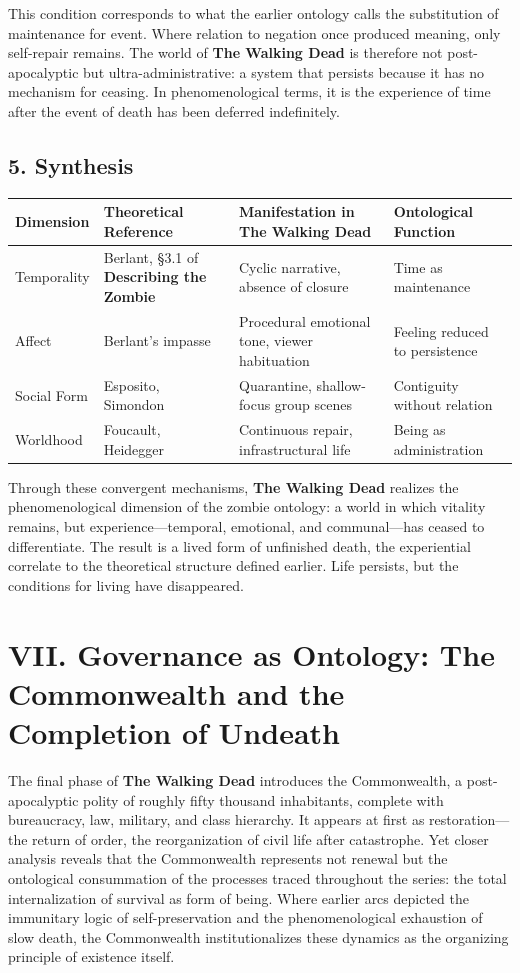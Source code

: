 \documentclass[11pt]{article}
\begin{document}
This condition corresponds to what the earlier ontology calls the substitution of maintenance for event.  Where relation to negation once produced meaning, only self-repair remains.  The world of \textbf{The Walking Dead} is therefore not post-apocalyptic but ultra-administrative: a system that persists because it has no mechanism for ceasing.  In phenomenological terms, it is the experience of time after the event of death has been deferred indefinitely.  
\subsection*{5. Synthesis}
\label{sec:orge80ebef}

\begin{center}
\begin{tabular}{llll}
Dimension & Theoretical Reference & Manifestation in \textbf{The Walking Dead} & Ontological Function\\
\hline
Temporality & Berlant, §3.1 of \textbf{Describing the Zombie} & Cyclic narrative, absence of closure & Time as maintenance\\
Affect & Berlant’s impasse & Procedural emotional tone, viewer habituation & Feeling reduced to persistence\\
Social Form & Esposito, Simondon & Quarantine, shallow-focus group scenes & Contiguity without relation\\
Worldhood & Foucault, Heidegger & Continuous repair, infrastructural life & Being as administration\\
\end{tabular}
\end{center}

Through these convergent mechanisms, \textbf{The Walking Dead} realizes the phenomenological dimension of the zombie ontology: a world in which vitality remains, but experience—temporal, emotional, and communal—has ceased to differentiate.  The result is a lived form of unfinished death, the experiential correlate to the theoretical structure defined earlier.  Life persists, but the conditions for living have disappeared.  
\section*{VII. Governance as Ontology: The Commonwealth and the Completion of Undeath}
\label{sec:org8f68535}

The final phase of \textbf{The Walking Dead} introduces the Commonwealth, a post-apocalyptic polity of roughly fifty thousand inhabitants, complete with bureaucracy, law, military, and class hierarchy.  It appears at first as restoration—the return of order, the reorganization of civil life after catastrophe.  Yet closer analysis reveals that the Commonwealth represents not renewal but the ontological consummation of the processes traced throughout the series: the total internalization of survival as form of being.  Where earlier arcs depicted the immunitary logic of self-preservation and the phenomenological exhaustion of slow death, the Commonwealth institutionalizes these dynamics as the organizing principle of existence itself.  
\end{document}
